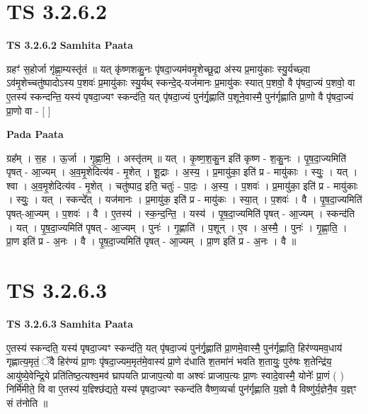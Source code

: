 \documentclass[17pt]{extarticle}
\begin{document}

\section{ TS 3.2.6.2 }

\textbf{TS 3.2.6.2 } \newline
\textbf{Samhita Paata} \newline

ग्रहꣳ॑ स॒होर्जा गृ॑ह्णा॒म्यस्तृ॑तं ॥ यत् कृ॑ष्णशकु॒नः पृ॑षदा॒ज्यम॑वमृ॒शेच्छू॒द्रा अ॑स्य प्र॒मायु॑काः स्यु॒र्यच्छ्वा ऽव॑मृ॒शेच्चतु॑ष्पादोऽस्य प॒शवः॑ प्र॒मायु॑काः स्यु॒र्यथ् स्कन्दे॒द्-यज॑मानः प्र॒मायु॑कः स्यात् प॒शवो॒ वै पृ॑षदा॒ज्यं प॒शवो॒ वा ए॒तस्य॑ स्कन्दन्ति॒ यस्य॑ पृषदा॒ज्यꣳ स्कन्द॑ति॒ यत् पृ॑षदा॒ज्यं पुन॑र्गृ॒ह्णाति॑ प॒शूने॒वास्मै॒ पुन॑र्गृह्णाति प्रा॒णो वै पृ॑षदा॒ज्यं प्रा॒णो वा - [  ] \newline

\textbf{Pada Paata} \newline

ग्रह᳚म् । स॒ह । ऊ॒र्जा । गृ॒ह्णा॒मि॒ । अस्तृ॑तम् ॥ यत् । कृ॒ष्ण॒श॒कु॒न इति॑ कृष्ण - श॒कु॒नः । पृ॒ष॒दा॒ज्यमिति॑ पृषत् - आ॒ज्यम् । अ॒व॒मृ॒शेदित्य॑व - मृ॒शेत् । शू॒द्राः । अ॒स्य॒ । प्र॒मायु॑का॒ इति॑ प्र - मायु॑काः । स्युः॒ । यत् । श्वा । अ॒व॒मृ॒शेदित्य॑व - मृ॒शेत् । चतु॑ष्पाद॒ इति॒ चतुः॑ - पा॒दः॒ । अ॒स्य॒ । प॒शवः॑ । प्र॒मायु॑का॒ इति॑ प्र - मायु॑काः । स्युः॒ । यत् । स्कन्दे᳚त् । यज॑मानः । प्र॒मायु॑क॒ इति॑ प्र - मायु॑कः । स्या॒त् । प॒शवः॑ । वै । पृ॒ष॒दा॒ज्यमिति॑ पृषत्-आ॒ज्यम् । प॒शवः॑ । वै । ए॒तस्य॑ । स्क॒न्द॒न्ति॒ । यस्य॑ । पृ॒ष॒दा॒ज्यमिति॑ पृषत् - आ॒ज्यम् । स्कन्द॑ति । यत् । पृ॒ष॒दा॒ज्यमिति॑ पृषत् - आ॒ज्यम् । पुनः॑ । गृ॒ह्णाति॑ । प॒शून् । ए॒व । अ॒स्मै॒ । पुनः॑ । गृ॒ह्णा॒ति॒ । प्रा॒ण इति॑ प्र - अ॒नः । वै । पृ॒ष॒दा॒ज्यमिति॑ पृषत् - आ॒ज्यम् । प्रा॒ण इति॑ प्र - अ॒नः । वै ॥  \newline





\section{ TS 3.2.6.3 }

\textbf{TS 3.2.6.3 } \newline
\textbf{Samhita Paata} \newline

ए॒तस्य॑ स्कन्दति॒ यस्य॑ पृषदा॒ज्यꣳ स्कन्द॑ति॒ यत् पृ॑षदा॒ज्यं पुन॑र्गृ॒ह्णाति॑ प्रा॒णमे॒वास्मै॒ पुन॑र्गृह्णाति॒ हिर॑ण्यमव॒धाय॑ गृह्णात्य॒मृतं॒ ॅवै हिर॑ण्यं प्रा॒णः पृ॑षदा॒ज्यम॒मृत॑मे॒वास्य॑ प्रा॒णे द॑धाति श॒तमा॑नं भवति श॒तायुः॒ पुरु॑षः श॒तेन्द्रि॑य॒ आयु॑ष्ये॒वेन्द्रि॒ये प्रति॑तिष्ठ॒त्यश्व॒मव॑ घ्रापयति प्राजाप॒त्यो वा अश्वः॑ प्राजाप॒त्यः प्रा॒णः स्वादे॒वास्मै॒ योनेः᳚ प्रा॒णं ( ) निर्मि॑मीते॒ वि वा ए॒तस्य॑ य॒ज्ञ्श्छि॑द्यते॒ यस्य॑ पृषदा॒ज्यꣳ स्कन्द॑ति वैष्ण॒व्यर्चा पुन॑र्गृह्णाति य॒ज्ञो वै विष्णु॑र्य॒ज्ञेनै॒व य॒ज्ञ्ꣳ सं त॑नोति ॥ \newline
\end{document}
